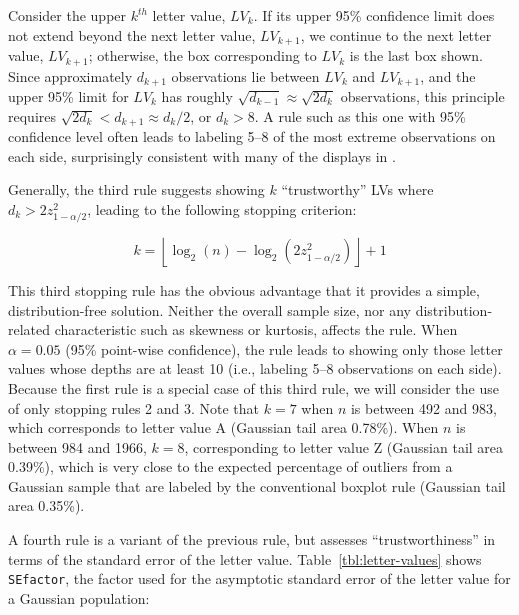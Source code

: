 \documentclass[oneside]{article}
\begin{document}
Consider the upper $k^{th}$ letter value, $LV_k$. If its upper 95\% confidence limit does not extend beyond the next letter value, $LV_{k+1}$, we continue to the next letter value, $LV_{k+1}$; otherwise, the box corresponding to $LV_k$ is the last box shown. Since approximately $d_{k+1}$ observations lie between $LV_k$ and $LV_{k+1}$, and the upper 95\% limit for $LV_k$ has roughly $\sqrt{d_{k-1}} \approx \sqrt{2 d_k }$ observations, this principle requires $\sqrt{2 d_k} < d_{k+1} \approx d_k / 2$, or $d_k > 8$. A rule such as this one with 95\% confidence level often leads to labeling 5--8 of the most extreme observations on each side, surprisingly consistent with many of the displays in \citet{eda}.

Generally, the third rule suggests showing $k$ ``trustworthy'' LVs where $d_k > 2 z_{1-\alpha/2}^2 $, leading to the following stopping criterion:

\begin{equation}
k =  \left \lfloor \log_2 (n) - \log_2 
   \left(2  z_{1-\alpha/2}^2 \right) \right \rfloor + 1
\end{equation}

\noindent This third stopping rule has the obvious advantage that it provides a simple, distribution-free solution. Neither the overall sample size, nor any distribution-related characteristic such as skewness or kurtosis, affects the rule. When $\alpha = 0.05$ (95\% point-wise confidence), the rule leads to showing only those letter values whose depths are at least 10 (i.e., labeling 5--8 observations on each side). Because the first rule is a special case of this third rule, we will consider the use of only stopping rules 2 and 3. Note that $k = 7$ when $n$ is between 492 and 983, which corresponds to letter value A (Gaussian tail area 0.78\%). When $n$ is between 984 and 1966, $k = 8$, corresponding to letter value Z (Gaussian tail area 0.39\%), which is very close to the expected percentage of outliers from a Gaussian sample that are labeled by the conventional boxplot rule (Gaussian tail area 0.35\%).


A fourth rule is a variant of the previous rule, but assesses ``trustworthiness'' in terms of the standard error of the letter value. Table~\ref{tbl:letter-values} shows \texttt{SEfactor}, the factor used for the asymptotic standard error of the letter value for a Gaussian population:
\end{document}
